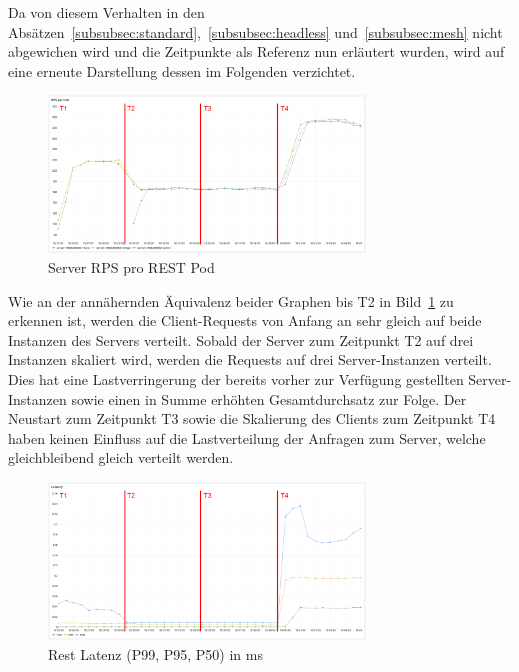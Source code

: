 Da von diesem Verhalten in den Absätzen~\ref{subsubsec:standard},~\ref{subsubsec:headless} und~\ref{subsubsec:mesh} nicht abgewichen wird und die Zeitpunkte als Referenz nun erläutert wurden, wird auf eine erneute Darstellung dessen im Folgenden verzichtet.

\begin{figure}[H]
    \centering
    \includegraphics[width=0.75\textwidth]{img/rest_rps}
    \caption{Server RPS pro REST Pod}
    \label{fig:rest_rps}
\end{figure}

Wie an der annähernden Äquivalenz beider Graphen bis T2 in Bild~\ref{fig:rest_rps} zu erkennen ist, werden die Client-Requests von Anfang an sehr gleich auf beide Instanzen des Servers verteilt.
Sobald der Server zum Zeitpunkt T2 auf drei Instanzen skaliert wird, werden die Requests auf drei Server-Instanzen verteilt.
Dies hat eine Lastverringerung der bereits vorher zur Verfügung gestellten Server-Instanzen sowie einen in Summe erhöhten Gesamtdurchsatz zur Folge.
Der Neustart zum Zeitpunkt T3 sowie die Skalierung des Clients zum Zeitpunkt T4 haben keinen Einfluss auf die Lastverteilung der Anfragen zum Server, welche gleichbleibend gleich verteilt werden.

\begin{figure}[H]
    \centering
    \includegraphics[width=0.75\textwidth]{img/rest_latenz}
    \caption{Rest Latenz (P99, P95, P50) in ms}
    \label{fig:rest_latenz}
\end{figure}

